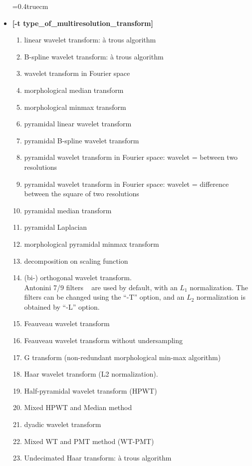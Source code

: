 \begin{itemize} 
\baselineskip=0.4truecm
\item {\bf [-t type\_of\_multiresolution\_transform]}
{\small 
\begin{enumerate}
\baselineskip=0.4truecm
\itemsep=0.1truecm
\item linear wavelet transform: \`a trous algorithm 
\item B-spline wavelet transform: \`a trous algorithm 
\item wavelet transform in Fourier space 
\item morphological median transform 
\item morphological minmax transform 
\item pyramidal linear wavelet transform 
\item pyramidal B-spline wavelet transform 
\item pyramidal wavelet transform in Fourier space: 
                     wavelet =  between two resolutions 
\item  pyramidal wavelet transform in Fourier space: 
                     wavelet = difference between the square of two resolutions
\item  pyramidal median transform 
\item  pyramidal Laplacian 
\item  morphological pyramidal minmax transform 
\item  decomposition on scaling function 
\item  (bi-) orthogonal wavelet transform. \\ 
Antonini 7/9 filters ~\cite{wave:antonini92} are used by default, with an 
$L_1$ normalization. The filters can be changed using the ``-T'' option, and
an $L_2$ normalization is obtained by ``-L'' option.
\item  Feauveau wavelet transform 
\item  Feauveau wavelet transform without undersampling 
\item  G transform (non-redundant morphological min-max algorithm)
\item Haar wavelet transform (L2 normalization).
\item Half-pyramidal wavelet transform (HPWT)
\item Mixed HPWT and Median method
\item dyadic wavelet transform 
\item Mixed WT and PMT method (WT-PMT) 
\item Undecimated Haar transform: \`a trous algorithm

\end{enumerate}}
\end{itemize}
